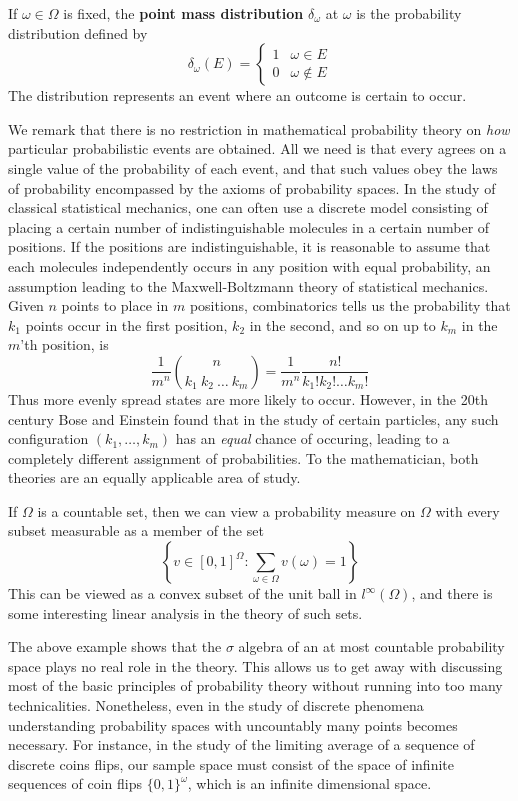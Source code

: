 \begin{example}
    If $\omega \in \Omega$ is fixed, the {\bf point mass distribution} $\delta_\omega$ at $\omega$ is the probability distribution defined by
    \[ \delta_\omega(E) = \begin{cases} 1 & \omega \in E \\ 0 & \omega \not \in E \end{cases} \]
    The distribution represents an event where an outcome is certain to occur.
\end{example}

We remark that there is no restriction in mathematical probability theory on {\it how} particular probabilistic events are obtained. All we need is that every agrees on a single value of the probability of each event, and that such values obey the laws of probability encompassed by the axioms of probability spaces. In the study of classical statistical mechanics, one can often use a discrete model consisting of placing a certain number of indistinguishable molecules in a certain number of positions. If the positions are indistinguishable, it is reasonable to assume that each molecules independently occurs in any position with equal probability, an assumption leading to the Maxwell-Boltzmann theory of statistical mechanics. Given $n$ points to place in $m$ positions, combinatorics tells us the probability that $k_1$ points occur in the first position, $k_2$ in the second, and so on up to $k_m$ in the $m$'th position, is
%
\[ \frac{1}{m^n} {n \choose k_1\ k_2\ \dots\ k_m} = \frac{1}{m^n} \frac{n!}{k_1! k_2! \dots k_m!} \]
%
Thus more evenly spread states are more likely to occur. However, in the 20th century Bose and Einstein found that in the study of certain particles, any such configuration $(k_1, \dots, k_m)$ has an {\it equal} chance of occuring, leading to a completely different assignment of probabilities. To the mathematician, both theories are an equally applicable area of study.

\begin{example}
    If $\Omega$ is a countable set, then we can view a probability measure on $\Omega$ with every subset measurable as a member of the set
    \[ \left\{ v \in [0,1]^\Omega: \sum_{\omega \in \Omega} v(\omega) = 1 \right\} \]
    This can be viewed as a convex subset of the unit ball in $l^\infty(\Omega)$, and there is some interesting linear analysis in the theory of such sets.
\end{example}

The above example shows that the $\sigma$ algebra of an at most countable probability space plays no real role in the theory. This allows us to get away with discussing most of the basic principles of probability theory without running into too many technicalities. Nonetheless, even in the study of discrete phenomena understanding probability spaces with uncountably many points becomes necessary. For instance, in the study of the limiting average of a sequence of discrete coins flips, our sample space must consist of the space of infinite sequences of coin flips $\{ 0, 1 \}^\omega$, which is an infinite dimensional space. 

